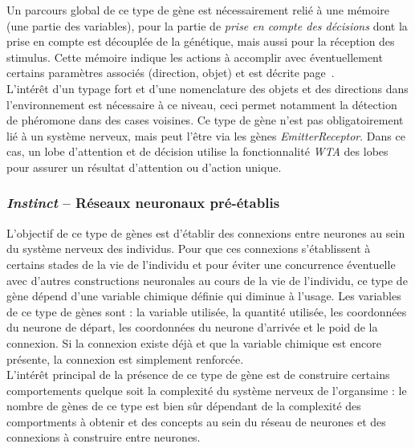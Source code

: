 \documentclass[11pt,twoside,a4paper]{article}
\begin{document}
Un parcours global de ce type de g{\`e}ne est n{\'e}cessairement reli{\'e} {\`a} une m{\'e}moire (une partie des variables), pour la partie de \emph{prise en compte des d{\'e}cisions} dont la prise en compte est d{\'e}coupl{\'e}e de la g{\'e}n{\'e}tique, mais aussi pour la r{\'e}ception des stimulus. Cette m{\'e}moire indique les actions {\`a} accomplir avec {\'e}ventuellement certains param{\`e}tres associ{\'e}s (direction, objet) et est d{\'e}crite page~\pageref{tab:NomenclatureStimuliDecision}.~\\

L'int{\'e}r{\^e}t d'un typage fort et d'une nomenclature des objets et des directions dans l'environnement est n{\'e}cessaire {\`a} ce niveau, ceci permet notamment la d{\'e}tection de ph{\'e}romone dans des cases voisines. Ce type de g{\`e}ne n'est pas obligatoirement li{\'e} {\`a} un syst{\`e}me nerveux, mais peut l'{\^e}tre via les g{\`e}nes \emph{EmitterReceptor}. Dans ce cas, un lobe d'attention et de d{\'e}cision utilise la fonctionnalit{\'e} \emph{WTA} des lobes pour assurer un r{\'e}sultat d'attention ou d'action unique. 

\subsubsection{\emph{Instinct} -- R{\'e}seaux neuronaux pr{\'e}-{\'e}tablis}

L'objectif de ce type de g{\`e}nes est d'{\'e}tablir des connexions entre neurones au sein du syst{\`e}me nerveux des individus. Pour que ces connexions s'{\'e}tablissent {\`a} certains stades de la vie de l'individu et pour {\'e}viter une concurrence {\'e}ventuelle avec d'autres constructions neuronales au cours de la vie de l'individu, ce type de g{\`e}ne d{\'e}pend d'une variable chimique d{\'e}finie qui diminue {\`a} l'usage. Les variables de ce type de g{\`e}nes sont : la variable utilis{\'e}e, la quantit{\'e} utilis{\'e}e, les coordonn{\'e}es du neurone de d{\'e}part, les coordonn{\'e}es du neurone d'arriv{\'e}e et le poid de la connexion. Si la connexion existe d{\'e}j{\`a} et que la variable chimique est encore pr{\'e}sente, la connexion est simplement renforc{\'e}e.~\\

L'int{\'e}r{\^e}t principal de la pr{\'e}sence de ce type de g{\`e}ne est de construire certains comportements quelque soit la complexit{\'e} du syst{\`e}me nerveux de l'organsime : le nombre de g{\`e}nes de ce type est bien s{\^u}r d{\'e}pendant de la complexit{\'e} des comportments {\`a} obtenir et des concepts au sein du r{\'e}seau de neurones et des connexions {\`a} construire entre neurones. 
\end{document}
